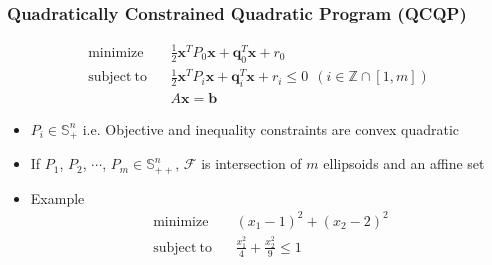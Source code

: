 \subsubsection*{Quadratically Constrained Quadratic Program (QCQP)}
$$ \begin{aligned}
    \mathrm{minimize}~~&~~\frac 1 2 \mathbf{x}^TP_0\mathbf{x} + \mathbf{q}_0^T\mathbf{x} + r_0 \\
    \mathrm{subject~to}~~&~~\frac 1 2 \mathbf{x}^TP_i\mathbf{x} + \mathbf{q}_i^T\mathbf{x} + r_i \leq 0~~(i \in \mathbb{Z} \cap [1,m]) \\
        &~~A\mathbf{x} = \mathbf{b}
\end{aligned} $$
\begin{itemize}
    \item $P_i \in \mathbb{S}^n_{+}$ i.e. Objective and inequality constraints are convex quadratic
    \item If $P_1$, $P_2$, $\cdots$, $P_m \in \mathbb{S}^n_{++}$, $\mathcal{F}$ is intersection of $m$ ellipsoids and an affine set
    \item Example
    $$ \begin{aligned}
        \mathrm{minimize}~~&~~(x_1 - 1)^2 + (x_2 - 2)^2 \\
        \mathrm{subject~to}~~&~~\frac {x_1^2} 4 + \frac {x_2^2} 9 \leq 1
    \end{aligned} $$
\end{itemize}
